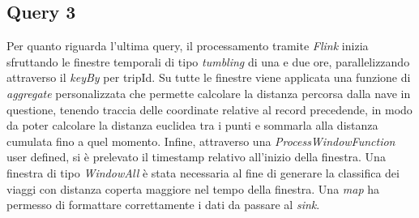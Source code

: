 \documentclass[conference]{IEEEtran}
\begin{document}
\subsection*{\textbf{Query 3}}
Per quanto riguarda l'ultima query, il processamento tramite \emph{Flink} inizia sfruttando le
finestre temporali di tipo \emph{tumbling}
di una e due ore, parallelizzando attraverso il \emph{keyBy} per tripId. Su tutte le finestre viene applicata una funzione di \emph{aggregate} personalizzata che permette calcolare la distanza percorsa dalla nave in questione, tenendo traccia delle coordinate relative al record precedende, in modo da poter calcolare la distanza euclidea tra i punti e sommarla alla distanza cumulata fino a quel momento. Infine, attraverso una \emph{ProcessWindowFunction} user defined, si \`{e} prelevato il timestamp relativo all'inizio della finestra. Una finestra di tipo \emph{WindowAll} \`{e} stata necessaria al fine di generare la classifica dei viaggi con distanza coperta maggiore nel tempo della finestra. Una \emph{map} ha permesso di formattare correttamente i dati da passare al \emph{sink}.
\end{document}
